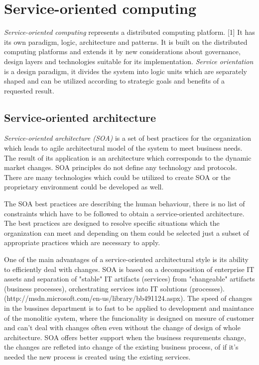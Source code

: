 \chapter{Service-oriented computing}
\label{chap:service-oriented computing}
\emph{Service-oriented computing} represents a distributed computing platform. [1] It has its own paradigm, logic, architecture and patterns. It is built on the distributed computing platforms and extends it by new considerations about governance, design layers and technologies suitable for its implementation.
\emph{Service orientation} is a design paradigm, it divides the system into logic units which are separately shaped and can be utilized according to strategic goals and benefits of a requested result.

\section{Service-oriented architecture}
\emph{Service-oriented architecture (SOA)} is a set of best practices for the organization which leads to agile architectural model of the system to meet business needs. The result of its application is an architecture which corresponds to the dynamic market changes. SOA principles do not define any technology and protocols. There are many technologies which could be utilized to create SOA or the proprietary environment could be developed as well. 

The SOA best practices are describing the human behaviour, there is no list of constraints which have to be followed to obtain a service-oriented architecture. The best practices are designed to resolve specific situations which the organization can meet and depending on them could be selected just a subset of appropriate practices which are necessary to apply.

One of the main advantages of a service-oriented architectural style is its ability to efficiently deal with changes. SOA is based on a decomposition of enterprise IT assets and separation of "stable" IT artifacts (services) from "changeable" artifacts (business processes), orchestrating services into IT solutions (processes). (http://msdn.microsoft.com/en-us/library/bb491124.aspx). The speed of changes in the bussines department is to fast to be applied to development and maintance of the monolitic system, where the funcionality is designed on mesure of customer and can't deal with changes often even without the change of design of whole architecture. SOA offers better support when the business requrements change, the changes are refleted into change of the existing business process, of if it's needed the new process is created using the existing services.


